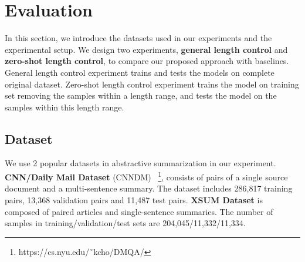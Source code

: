 \section{Evaluation}
\label{sec:eval}

In this section, we introduce the datasets used in our experiments and the experimental setup. We design two experiments, 
\textbf{general length control} and \textbf{zero-shot length control},
to compare our proposed approach with baselines.
General length control experiment trains and tests the models on complete original dataset.
Zero-shot length control experiment trains the model on training set removing the samples within a length range,
and tests the model on the samples within this length range.

\subsection{Dataset}
We use 2 popular datasets in abstractive summarization in our experiment.
\textbf{CNN/Daily Mail Dataset}
(CNNDM)~\cite{HermannKGEKSB15}
\footnote{https://cs.nyu.edu/˜kcho/DMQA/},
consists of pairs of a single source document and a multi-sentence summary.
The dataset includes 286,817 training pairs,
13,368 validation pairs and 11,487 test pairs.
\textbf{XSUM Dataset}
\cite{XSUM} is composed of paired articles and single-sentence summaries. 
The number of samples in training/validation/test sets are 204,045/11,332/11,334.


